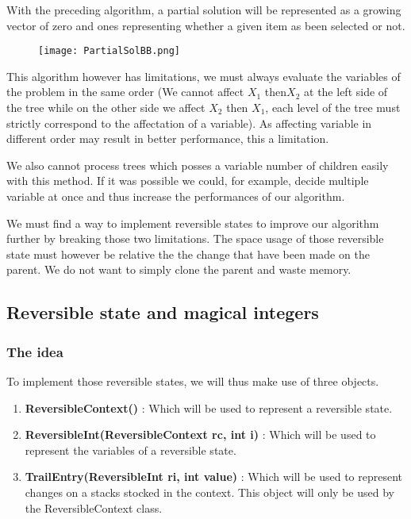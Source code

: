 With the preceding algorithm, a partial solution will be represented as a growing vector
of zero and ones representing whether a given item as been selected or not.

\begin{figure}[!ht]
    \centering
    \texttt{[image: PartialSolBB.png]}
    \label{fig:Knapsack_example}
\end{figure}
\FloatBarrier

This algorithm however has limitations, we must always evaluate the variables of the 
problem in the same order (We cannot affect $X_1$ then$ X_2$ at the left side of the tree 
while on the other side we affect $X_2$ then $X_1$, each level of the tree must strictly 
correspond to the affectation of a variable). As affecting variable in different order may result in better performance, this a limitation.\newline

We also cannot process trees which posses a variable number of children easily with this method. If it was possible we could, for example, decide multiple variable at once
and thus increase the performances of our algorithm. \newline

We must find a way to implement reversible states to improve our algorithm further
by breaking those two limitations. The space usage of those reversible state must however
be relative the the change that have been made on the parent. We do not want to simply
clone the parent and waste memory.

\subsection{Reversible state and magical integers}

\subsubsection{The idea}

To implement those reversible states, we will thus make use of three objects.

\begin{enumerate}
	\item \textbf{ReversibleContext()} : Which will be used to represent a 
	reversible state.
	\item \textbf{ReversibleInt(ReversibleContext rc, int i)} : Which will be used to 
	represent the variables of a reversible state.
	\item \textbf{TrailEntry(ReversibleInt ri, int value)} : Which will be used
	to represent changes on a stacks stocked in the context. This object will
	only be used by the ReversibleContext class.
\end{enumerate}

